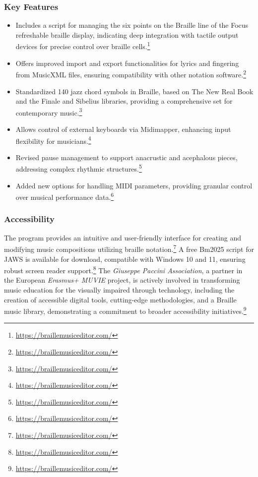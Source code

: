 \subsubsection{Key Features}
\begin{itemize}
    \item Includes a script for managing the six points on the Braille line of the Focus refreshable braille display, indicating deep integration with tactile output devices for precise control over braille cells.\footnote{\url{https://braillemusiceditor.com/}}
    \item Offers improved import and export functionalities for lyrics and fingering from MusicXML files, ensuring compatibility with other notation software.\footnote{\url{https://braillemusiceditor.com/}}
    \item Standardized 140 jazz chord symbols in Braille, based on The New Real Book and the Finale and Sibelius libraries, providing a comprehensive set for contemporary music.\footnote{\url{https://braillemusiceditor.com/}}
    \item Allows control of external keyboards via Midimapper, enhancing input flexibility for musicians.\footnote{\url{https://braillemusiceditor.com/}}
    \item Revised pause management to support anacrustic and acephalous pieces, addressing complex rhythmic structures.\footnote{\url{https://braillemusiceditor.com/}}
    \item Added new options for handling MIDI parameters, providing granular control over musical performance data.\footnote{\url{https://braillemusiceditor.com/}}
\end{itemize}

\subsubsection{Accessibility}
The program provides an intuitive and user-friendly interface for creating and modifying music compositions utilizing braille notation.\footnote{\url{https://braillemusiceditor.com/}} A free Bm2025 script for JAWS is available for download, compatible with Windows 10 and 11, ensuring robust screen reader support.\footnote{\url{https://braillemusiceditor.com/}} The \textit{Giuseppe Paccini Association}, a partner in the European \textit{Erasmus+ MUVIE} project, is actively involved in transforming music education for the visually impaired through technology, including the creation of accessible digital tools, cutting-edge methodologies, and a Braille music library, demonstrating a commitment to broader accessibility initiatives.\footnote{\url{https://braillemusiceditor.com/}}

